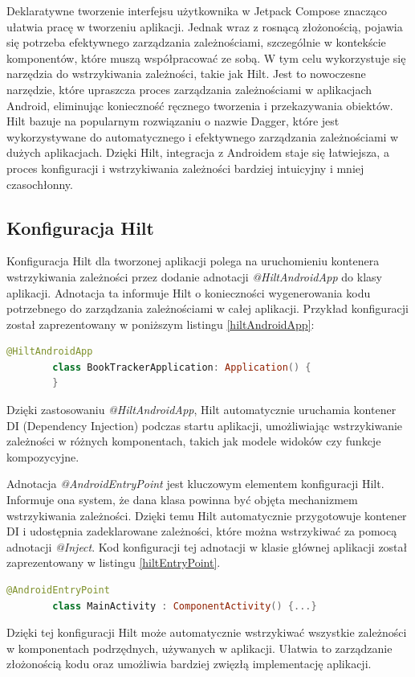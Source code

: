 \documentclass[12pt,twoside]{article}
\begin{document}
Deklaratywne tworzenie interfejsu użytkownika w Jetpack Compose znacząco ułatwia pracę w tworzeniu aplikacji. Jednak
wraz z rosnącą złożonością, pojawia się potrzeba efektywnego zarządzania zależnościami, szczególnie w kontekście 
komponentów, które muszą współpracować ze sobą. W tym celu wykorzystuje się narzędzia do wstrzykiwania zależności, 
takie jak Hilt. Jest to nowoczesne narzędzie, które upraszcza proces zarządzania zależnościami w aplikacjach Android, 
eliminując konieczność ręcznego tworzenia i przekazywania obiektów. Hilt bazuje na popularnym rozwiązaniu o nazwie 
Dagger, które jest wykorzystywane do automatycznego i efektywnego zarządzania zależnościami w dużych aplikacjach. 
Dzięki Hilt, integracja z Androidem staje się łatwiejsza, a proces konfiguracji i wstrzykiwania zależności bardziej 
intuicyjny i mniej czasochłonny.

\subsection{Konfiguracja Hilt}

Konfiguracja Hilt dla tworzonej aplikacji polega na uruchomieniu kontenera wstrzykiwania zależności przez dodanie 
adnotacji \textit{@HiltAndroidApp} do klasy aplikacji. Adnotacja ta informuje Hilt o konieczności wygenerowania kodu 
potrzebnego do zarządzania zależnościami w całej aplikacji. Przykład konfiguracji został zaprezentowany w poniższym 
listingu \ref{hiltAndroidApp}:

\begin{lstlisting}[language=Kotlin,caption=Konfiguracja Hilt w aplikacji, label={hiltAndroidApp}]
	@HiltAndroidApp
		class BookTrackerApplication: Application() {
		}
\end{lstlisting}
Dzięki zastosowaniu \textit{@HiltAndroidApp}, Hilt automatycznie uruchamia kontener DI (Dependency Injection) podczas startu 
aplikacji, umożliwiając wstrzykiwanie zależności w różnych komponentach, takich jak modele widoków czy funkcje 
kompozycyjne.

Adnotacja \textit{@AndroidEntryPoint} jest kluczowym elementem konfiguracji Hilt. Informuje ona system, że dana klasa 
powinna być objęta mechanizmem wstrzykiwania zależności. Dzięki temu Hilt automatycznie przygotowuje kontener DI i 
udostępnia zadeklarowane zależności, które można wstrzykiwać za pomocą adnotacji \textit{@Inject}. Kod konfiguracji tej 
adnotacji w klasie głównej aplikacji został zaprezentowany w listingu \ref{hiltEntryPoint}.
\begin{lstlisting}[language=Kotlin,caption=Przykład użycia \textit{@AndroidEntryPoint} w MainActivity, label={hiltEntryPoint}]
	@AndroidEntryPoint
		class MainActivity : ComponentActivity() {...}
\end{lstlisting}
Dzięki tej konfiguracji Hilt może automatycznie wstrzykiwać wszystkie zależności w komponentach podrzędnych, 
używanych w aplikacji. Ułatwia to zarządzanie złożonością kodu oraz umożliwia bardziej zwięzłą implementację 
aplikacji.
\end{document}
